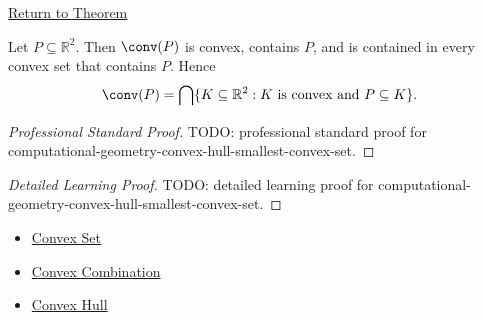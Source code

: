 \newpage
{}
\label{prf:computational-geometry-convex-hull-smallest-convex-set}

\begin{remark*}[Return]
\hyperref[lem:computational-geometry-convex-hull-smallest-convex-set]{Return to Theorem}
\end{remark*}

\begin{theorem*}
Let \(P\subseteq\mathbb{R}^2\). Then \(\conv(P)\) is convex, contains \(P\), and
is contained in every convex set that contains \(P\). Hence
\[
  \conv(P)
  =
  \bigcap\{K\subseteq\mathbb{R}^2 : K\text{ is convex and }P\subseteq K\}.
\]
\end{theorem*}

\begin{proof}[Professional Standard Proof]
\LRAProofBodyStart
TODO: professional standard proof for computational-geometry-convex-hull-smallest-convex-set.
\end{proof}

\begin{proof}[Detailed Learning Proof]
\LRAProofBodyStart
TODO: detailed learning proof for computational-geometry-convex-hull-smallest-convex-set.
\end{proof}

\begin{remark*}
\end{remark*}

\begin{dependencies}
\begin{itemize}
  \item \hyperref[def:computational-geometry-convex-set]{Convex Set}
  \item \hyperref[def:computational-geometry-convex-combination]{Convex Combination}
  \item \hyperref[def:computational-geometry-convex-hull]{Convex Hull}
\end{itemize}
\end{dependencies}

\clearpage
